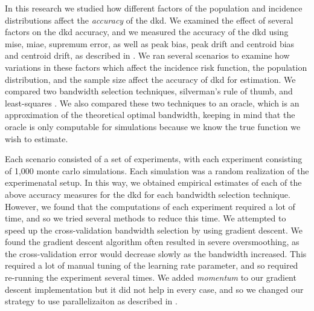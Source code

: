 

In this research we studied how different factors of the population and incidence distributions
affect the \textit{accuracy} of the \gls{dkd}.
We examined the effect of several factors on the \gls{dkd} accuracy,
and we measured the accuracy of the \gls{dkd} using \gls{mise},
\gls{miae}, \gls{supremum error}, as well as \gls{peak bias},
\gls{peak drift} and \gls{centroid bias} and \gls{centroid drift},
as described in .
We ran several scenarios to examine how variations in these factors which affect the incidence risk function,
the population distribution, and the sample size affect the accuracy of \gls{dkd} for estimation.
We compared two bandwidth selection techniques, \gls{silverman}'s rule of thumb,
and least-squares .
We also compared these two techniques to an \gls{oracle},
which is an approximation of the theoretical optimal bandwidth,
keeping in mind that the oracle is only computable for simulations because we know the true function we wish to estimate.

Each scenario consisted of a set of experiments,
with each experiment consisting of 1,000 monte carlo simulations.
Each simulation was a random realization of the experimenatal setup.
In this way,
we obtained empirical estimates of each of the above accuracy measures for the \gls{dkd}
for each bandwidth selection technique.
However,
we found that the computations of each experiment required a lot of time,
and so we tried several methods to reduce this time.
We attempted to speed up the cross-validation bandwidth selection by using gradient descent.
We found the gradient descent algorithm often resulted in severe oversmoothing,
as the cross-validation error would decrease slowly as the bandwidth increased.
This required a lot of manual tuning of the learning rate parameter,
and so required re-running the experiment several times.
We added \textit{momentum} to our gradient descent implementation but it did not help in every case,
and so we changed our strategy to use parallelizaiton as described in .



